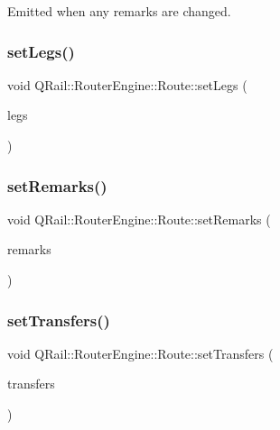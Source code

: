 Emitted when any remarks are changed. 

\mbox{\label{classQRail_1_1RouterEngine_1_1Route_af472483ea371f0b6a0fc88c1ea303a49}} 
\subsubsection{\texorpdfstring{setLegs()}{setLegs()}}
{\footnotesize\ttfamily void Q\+Rail\+::\+Router\+Engine\+::\+Route\+::set\+Legs (\begin{DoxyParamCaption}\item[{const Q\+List$<$ \mbox{\hyperlink{classQRail_1_1RouterEngine_1_1RouteLeg}{Route\+Leg}} $\ast$ $>$ \&}]{legs }\end{DoxyParamCaption})}

\mbox{\label{classQRail_1_1RouterEngine_1_1Route_a4882ad008ab1eff92496fa76c2e15ee1}} 
\subsubsection{\texorpdfstring{setRemarks()}{setRemarks()}}
{\footnotesize\ttfamily void Q\+Rail\+::\+Router\+Engine\+::\+Route\+::set\+Remarks (\begin{DoxyParamCaption}\item[{const Q\+List$<$ \mbox{\hyperlink{classQRail_1_1AlertsEngine_1_1Message}{Q\+Rail\+::\+Alerts\+Engine\+::\+Message}} $\ast$ $>$ \&}]{remarks }\end{DoxyParamCaption})}

\mbox{\label{classQRail_1_1RouterEngine_1_1Route_a1e1f995678ad634713f038364e48d809}} 
\subsubsection{\texorpdfstring{setTransfers()}{setTransfers()}}
{\footnotesize\ttfamily void Q\+Rail\+::\+Router\+Engine\+::\+Route\+::set\+Transfers (\begin{DoxyParamCaption}\item[{const Q\+List$<$ \mbox{\hyperlink{classQRail_1_1RouterEngine_1_1Transfer}{Q\+Rail\+::\+Router\+Engine\+::\+Transfer}} $\ast$ $>$ \&}]{transfers }\end{DoxyParamCaption})}

